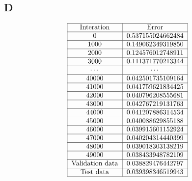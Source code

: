 \documentclass{article}
\begin{document}
        \subsection{D}
            \[
                \begin{tabular}{|c|c|}
                    \hline
                    \text{Interation} & \text{Error} \\
                    \hline
                    0 & 0.537155024662484 \\
                    \hline
                    1000 & 0.149062349319850 \\
                    \hline
                    2000 & 0.124576012748911 \\
                    \hline
                    3000 & 0.111371770213344 \\
                    \hline
                    $\cdots$ & $\cdots$\\
                    \hline
                    40000 & 0.042501735109164 \\
                    \hline
                    41000 & 0.041759621834425 \\
                    \hline
                    42000 & 0.040796208555681 \\
                    \hline
                    43000 & 0.042767219131763 \\
                    \hline
                    44000 & 0.041207886314534 \\
                    \hline
                    45000 & 0.040088629855188 \\
                    \hline
                    46000 & 0.039915601152924 \\
                    \hline
                    47000 & 0.040204314440399 \\
                    \hline
                    48000 & 0.039018303138219 \\
                    \hline
                    49000 & 0.038433948782109 \\
                    \hline
                    \text{Validation data} & 0.038829476442797\\
                    \hline
                    \text{Test data} & 0.039398346519943\\
                    \hline
                \end{tabular}
            \]
\end{document}
